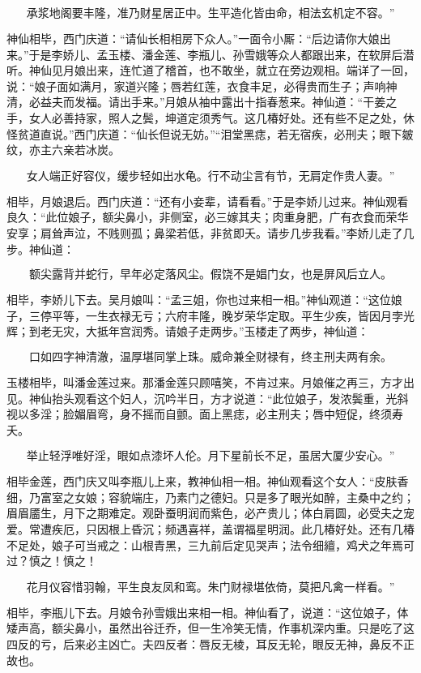 \[
承浆地阁要丰隆，准乃财星居正中。
生平造化皆由命，相法玄机定不容。”
\]

神仙相毕，西门庆道：“请仙长相相房下众人。”一面令小厮：“后边请你大娘出来。”于是李娇儿、孟玉楼、潘金莲、李瓶儿、孙雪娥等众人都跟出来，在软屏后潜听。神仙见月娘出来，连忙道了稽首，也不敢坐，就立在旁边观相。端详了一回，说：“娘子面如满月，家道兴隆；唇若红莲，衣食丰足，必得贵而生子；声响神清，必益夫而发福。请出手来。”月娘从袖中露出十指春葱来。神仙道：“干姜之手，女人必善持家，照人之鬓，坤道定须秀气。这几椿好处。还有些不足之处，休怪贫道直说。”西门庆道：“仙长但说无妨。”“泪堂黑痣，若无宿疾，必刑夫；眼下皴纹，亦主六亲若冰炭。

\[
女人端正好容仪，缓步轻如出水龟。
行不动尘言有节，无肩定作贵人妻。”
\]

相毕，月娘退后。西门庆道：“还有小妾辈，请看看。”于是李娇儿过来。神仙观看良久：“此位娘子，额尖鼻小，非侧室，必三嫁其夫；肉重身肥，广有衣食而荣华安享；肩耸声泣，不贱则孤；鼻梁若低，非贫即夭。请步几步我看。”李娇儿走了几步。神仙道：

\[
额尖露背并蛇行，早年必定落风尘。
假饶不是娼门女，也是屏风后立人。
\]

相毕，李娇儿下去。吴月娘叫：“孟三姐，你也过来相一相。”神仙观道：“这位娘子，三停平等，一生衣禄无亏；六府丰隆，晚岁荣华定取。平生少疾，皆因月孛光辉；到老无灾，大抵年宫润秀。请娘子走两步。”玉楼走了两步，神仙道：

\[
口如四字神清澈，温厚堪同掌上珠。
威命兼全财禄有，终主刑夫两有余。
\]

玉楼相毕，叫潘金莲过来。那潘金莲只顾嘻笑，不肯过来。月娘催之再三，方才出见。神仙抬头观看这个妇人，沉吟半日，方才说道：“此位娘子，发浓鬓重，光斜视以多淫；脸媚眉弯，身不摇而自颤。面上黑痣，必主刑夫；唇中短促，终须寿夭。

\[
举止轻浮唯好淫，眼如点漆坏人伦。
月下星前长不足，虽居大厦少安心。”
\]

相毕金莲，西门庆又叫李瓶儿上来，教神仙相一相。神仙观看这个女人：“皮肤香细，乃富室之女娘；容貌端庄，乃素门之德妇。只是多了眼光如醉，主桑中之约；眉眉靥生，月下之期难定。观卧蚕明润而紫色，必产贵儿；体白肩圆，必受夫之宠爱。常遭疾厄，只因根上昏沉；频遇喜祥，盖谓福星明润。此几椿好处。还有几椿不足处，娘子可当戒之：山根青黑，三九前后定见哭声；法令细繵，鸡犬之年焉可过？慎之！慎之！

\[
花月仪容惜羽翰，平生良友凤和鸾。
朱门财禄堪依倚，莫把凡禽一样看。”
\]

相毕，李瓶儿下去。月娘令孙雪娥出来相一相。神仙看了，说道：“这位娘子，体矮声高，额尖鼻小，虽然出谷迁乔，但一生冷笑无情，作事机深内重。只是吃了这四反的亏，后来必主凶亡。夫四反者：唇反无棱，耳反无轮，眼反无神，鼻反不正故也。

